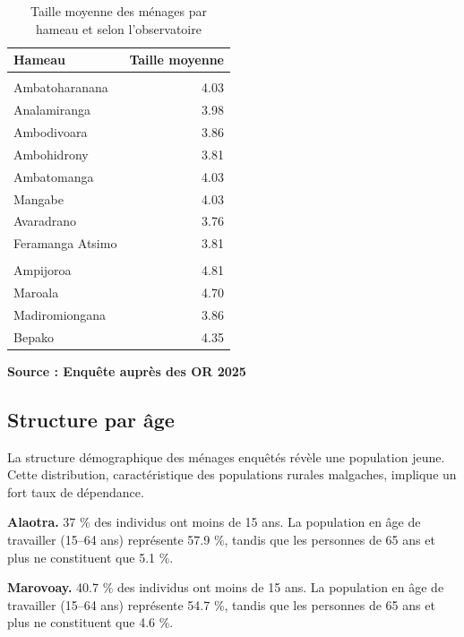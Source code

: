 \documentclass[
  french,
  letterpaper,
]{report}
\begin{document}
\begin{table}
\caption*{
{\fontsize{20}{25}\selectfont  Taille moyenne des ménages par hameau et selon l'observatoire\fontsize{12}{15}\selectfont }
} 
\fontsize{12.0pt}{14.0pt}\selectfont
\begin{tabular*}{\linewidth}{@{\extracolsep{\fill}}lr}
\toprule
Hameau & Taille moyenne \\ 
\midrule\addlinespace[2.5pt]
\multicolumn{2}{l}{{\bfseries {Alaotra}}} \\[2.5pt] 
\midrule\addlinespace[2.5pt]
Ambatoharanana & 4.03 \\ 
Analamiranga & 3.98 \\ 
Ambodivoara & 3.86 \\ 
Ambohidrony & 3.81 \\ 
Ambatomanga & 4.03 \\ 
Mangabe & 4.03 \\ 
Avaradrano & 3.76 \\ 
Feramanga Atsimo & 3.81 \\ 
\midrule\addlinespace[2.5pt]
\multicolumn{2}{l}{{\bfseries {Marovoay}}} \\[2.5pt] 
\midrule\addlinespace[2.5pt]
Ampijoroa & 4.81 \\ 
Maroala & 4.70 \\ 
Madiromiongana & 3.86 \\ 
Bepako & 4.35 \\ 
\bottomrule
\end{tabular*}
\begin{minipage}{\linewidth}
\textbf{Source : Enquête auprès des OR 2025}\\
\end{minipage}
\end{table}

\subsection{Structure par âge}\label{structure-par-uxe2ge}

La structure démographique des ménages enquêtés révèle une population
jeune. Cette distribution, caractéristique des populations rurales
malgaches, implique un fort taux de dépendance.

\textbf{Alaotra.} 37 \% des individus ont moins de 15 ans. La population
en âge de travailler (15--64 ans) représente 57.9 \%, tandis que les
personnes de 65 ans et plus ne constituent que 5.1 \%.

\textbf{Marovoay.} 40.7 \% des individus ont moins de 15 ans. La
population en âge de travailler (15--64 ans) représente 54.7 \%, tandis
que les personnes de 65 ans et plus ne constituent que 4.6 \%.
\end{document}
